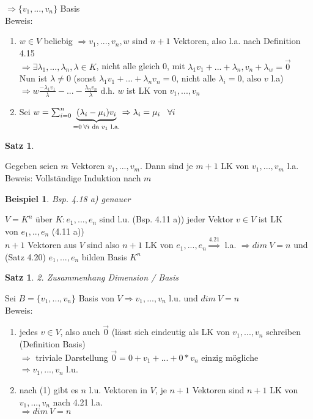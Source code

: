 \documentclass[a4paper,11pt]{article}
\newtheorem{satz}[definition]{Satz}
\newtheorem{bsp}[definition]{Beispiel}
\begin{document}
$\Rightarrow\{v_1,...,v_n\}$ Basis \\
Beweis: \\
\begin{enumerate}[label=(\arabic*)]
\vspace{-5mm}
\item $w\in V$ beliebig $\Rightarrow v_1,...,v_n,w$ sind $n+1$ Vektoren, also l.a. nach Definition 4.15 \\
$\Rightarrow\exists\lambda_1,...,\lambda_n,\lambda\in K$, nicht alle gleich 0, mit $\lambda_1v_1+...+\lambda_n,v_n+\lambda_w=\overset{\rightarrow}{0}$ \\
Nun ist $\lambda\neq 0$ (sonst $\lambda_1v_1+...+\lambda_nv_n=0$, nicht alle $\lambda_i=0$, also $v$ l.a) \\
$\Rightarrow w\frac{-\lambda_1v_1}{\lambda}-...-\frac{\lambda_nv_n}{\lambda}$ d.h. $w$ ist LK von $v_1,...,v_n$
\item Sei $w=\sum^n_{i=0}\underbrace{(\lambda_i-\mu_i)v_i}_{=0\:\forall i\text{ da } v_1 \text{ l.a.}}\Rightarrow\lambda_i=\mu_i\hspace{3mm}\forall i$
\end{enumerate}
\begin{satz}
\end{satz}
Gegeben seien $m$ Vektoren $v_1,...,v_m$. Dann sind je $m+1$ LK von $v_1,...,v_m$ l.a. \\
Beweis: Vollständige Induktion nach $m$
\newpage
\begin{bsp}
Bsp. 4.18 a) genauer
\end{bsp}
$V=K^n$ über $K\colon e_1,...,e_n$ sind l.u. (Bsp. 4.11 a)) jeder Vektor $v\in V$ ist LK \\
von $e_1,..,e_n$ (4.11 a)) \\
$n+1$ Vektoren aus $V$ sind also $n+1$ LK von $e_1,...,e_n\overset{4.21}{\Rightarrow}$ l.a. $\Rightarrow dim\:V=n$ und (Satz 4.20) $e_1,...,e_n$ bilden Basis $K^n$
\begin{satz}
2. Zusammenhang Dimension / Basis
\end{satz}
Sei $B=\{v_1,...,v_n\}$ Basis von $V\Rightarrow v_1,...,v_n$ l.u. und $dim\:V=n$ \\
Beweis:
\begin{enumerate}[label=(\arabic*)]
\item jedes $v\in V$, also auch $\overset{\rightarrow}{0}$ (lässt sich eindeutig als LK von $v_1,...,v_n$ schreiben (Definition Basis) \\
$\Rightarrow$ triviale Darstellung $\overset{\rightarrow}{0}=0+v_1+...+0*v_n$ einzig mögliche \\
$\Rightarrow v_1,...,v_n$ l.u.
\item nach (1) gibt es $n$ l.u. Vektoren in $V$, je $n+1$ Vektoren sind $n+1$ LK von $v_1,...,v_n$ nach 4.21 l.a. \\
$\Rightarrow dim\:V=n$
\end{enumerate}
\end{document}
